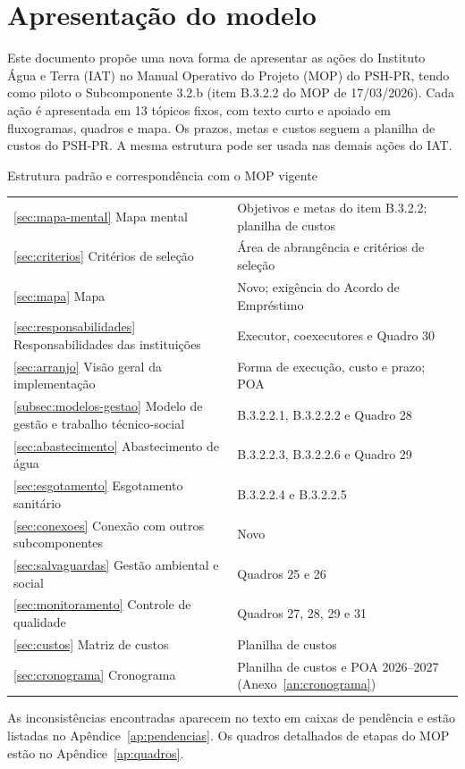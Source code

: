 \chapter*[Apresentação do modelo]{Apresentação do modelo}

Este documento propõe uma nova forma de apresentar as ações do Instituto Água
e Terra (IAT) no Manual Operativo do Projeto (MOP) do PSH-PR, tendo como
piloto o Subcomponente 3.2.b (item B.3.2.2 do MOP de 17/03/2026). Cada ação é
apresentada em 13 tópicos fixos, com texto curto e apoiado em fluxogramas,
quadros e mapa. Os prazos, metas e custos seguem a planilha de custos do
PSH-PR. A mesma estrutura pode ser usada nas demais ações do IAT.

\begin{quadro}[htbp]
\caption{Estrutura padrão e correspondência com o MOP vigente}
\label{qua:correspondencia}
\footnotesize
\renewcommand{\arraystretch}{1.2}
\begin{tabularx}{\textwidth}{|P{5.4cm}|L|}
\hline
{} &  \\ \hline
\ref{sec:mapa-mental} Mapa mental & Objetivos e metas do item B.3.2.2; planilha de custos \\ \hline
\ref{sec:criterios} Critérios de seleção & Área de abrangência e critérios de seleção \\ \hline
\ref{sec:mapa} Mapa & Novo; exigência do Acordo de Empréstimo \\ \hline
\ref{sec:responsabilidades} Responsabilidades das instituições & Executor, coexecutores e Quadro 30 \\ \hline
\ref{sec:arranjo} Visão geral da implementação & Forma de execução, custo e prazo; POA \\ \hline
\ref{subsec:modelos-gestao} Modelo de gestão e trabalho técnico-social & B.3.2.2.1, B.3.2.2.2 e Quadro 28 \\ \hline
\ref{sec:abastecimento} Abastecimento de água & B.3.2.2.3, B.3.2.2.6 e Quadro 29 \\ \hline
\ref{sec:esgotamento} Esgotamento sanitário & B.3.2.2.4 e B.3.2.2.5 \\ \hline
\ref{sec:conexoes} Conexão com outros subcomponentes & Novo \\ \hline
\ref{sec:salvaguardas} Gestão ambiental e social & Quadros 25 e 26 \\ \hline
\ref{sec:monitoramento} Controle de qualidade & Quadros 27, 28, 29 e 31 \\ \hline
\ref{sec:custos} Matriz de custos & Planilha de custos \\ \hline
\ref{sec:cronograma} Cronograma & Planilha de custos e POA 2026--2027 (Anexo~\ref{an:cronograma}) \\ \hline
\end{tabularx}
\end{quadro}

As inconsistências encontradas aparecem no texto em caixas de pendência e
estão listadas no Apêndice~\ref{ap:pendencias}. Os quadros detalhados de
etapas do MOP estão no Apêndice~\ref{ap:quadros}.
